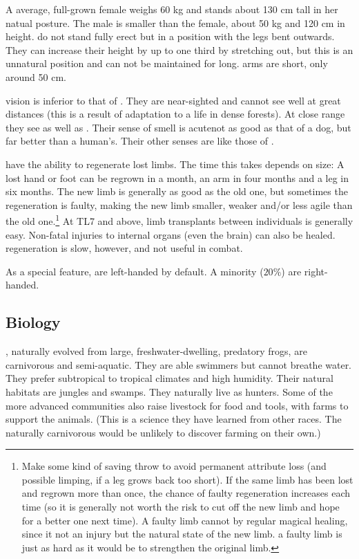 A average, full-grown \meccaran{} female weighs 60 kg and stands about 130 cm tall in her natual posture. The male is smaller than the female, about 50 kg and 120 cm in height. \Meccarans{} do not stand fully erect but in a  position with the legs bent outwards. They can increase their height by up to one third by stretching out, but this is an unnatural position and can not be maintained for long. \Meccaran{} arms are short, only around 50 cm. 

\Meccaran{} vision is inferior to that of \humans. They are near-sighted and cannot see well at great distances (this is a result of adaptation to a life in dense forests). At close range they see as well as \humans. Their sense of smell is acute\dash not as good as that of a dog, but far better than a human's. Their other senses are like those of \humans. 

\Meccara{} have the ability to regenerate lost limbs. The time this takes depends on size: A lost hand or foot can be regrown in a month, an arm in four months and a leg in six months. The new limb is generally as good as the old one, but sometimes the regeneration is faulty, making the new limb smaller, weaker and/or less agile than the old one.\footnote{Make some kind of saving throw to avoid permanent attribute loss (and possible limping, if a leg grows back too short). If the same limb has been lost and regrown more than once, the chance of faulty regeneration increases each time (so it is generally not worth the risk to cut off the new limb and hope for a better one next time). A faulty limb cannot  by regular magical healing, since it not an injury but the natural state of the new limb.  a faulty limb is just as hard as it would be to strengthen the original limb.} At TL7 and above, limb transplants between individuals is generally easy. Non-fatal injuries to internal organs (even the brain) can also be healed. \Meccaran{} regeneration is slow, however, and not useful in combat. 

As a special feature, \meccara{} are left-handed by default. A minority ($20\%$) are right-handed. 









\subsection{Biology}
\Meccara{}, naturally evolved from large, freshwater-dwelling, predatory frogs, are carnivorous and semi-aquatic. They are able swimmers but cannot breathe water. They prefer subtropical to tropical climates and high humidity. Their natural habitats are jungles and swamps. They naturally live as hunters. Some of the more advanced \meccaran{} communities also raise livestock for food and tools, with farms to support the animals. (This is a science they have learned from other races. The naturally carnivorous \meccara{} would be unlikely to discover farming on their own.) 

